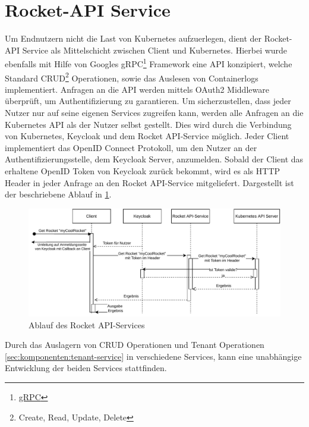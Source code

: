 \section{Rocket-API Service}
\label{sec:komponenten:rocket-api-service}
Um Endnutzern nicht die Last von Kubernetes aufzuerlegen, dient der Rocket-API Service als Mittelschicht zwischen
Client und Kubernetes. Hierbei wurde ebenfalls mit Hilfe von Googles gRPC\footnote{\href{https://grpc.io/}{gRPC}} Framework
eine API konzipiert, welche Standard CRUD\footnote{Create, Read, Update, Delete} Operationen, sowie das Auslesen
von Containerlogs implementiert.
Anfragen an die API werden mittels OAuth2 Middleware überprüft, um Authentifizierung zu garantieren. Um sicherzustellen,
dass jeder Nutzer nur auf seine eigenen Services zugreifen kann, werden alle Anfragen an die Kubernetes API als der
Nutzer selbst gestellt. Dies wird durch die Verbindung von Kubernetes, Keycloak und dem Rocket API-Service möglich.
Jeder Client implementiert das OpenID Connect Protokoll, um den Nutzer an der Authentifizierungsstelle, dem Keycloak
Server, anzumelden. Sobald der Client das erhaltene OpenID Token von Keycloak zurück bekommt,
wird es als HTTP Header in jeder Anfrage an den Rocket API-Service mitgeliefert.
Dargestellt ist der beschriebene Ablauf in \ref{fig:rocket-api-service-flow}.

\begin{figure}[h]
  \centering
  \includegraphics[height=0.5\textwidth]{gfx/chapters/3_komponenten/api-service-flow.pdf}
  \caption{Ablauf des Rocket API-Services}
  \label{fig:rocket-api-service-flow}
\end{figure}

Durch das Auslagern von CRUD Operationen und Tenant Operationen \ref{sec:komponenten:tenant-service} in
verschiedene Services, kann eine unabhängige Entwicklung der beiden Services stattfinden.